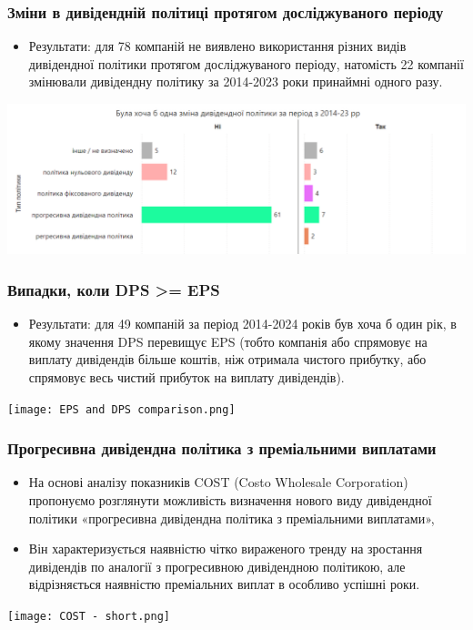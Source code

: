 \documentclass[aspectratio=169]{beamer}
\begin{document}
\begin{frame}
\frametitle{Зміни в дивідендній політиці протягом досліджуваного періоду}
\begin{center}
\begin{itemize}
\item  \alert {Результати:} для 78 компаній не виявлено використання різних видів дивідендної політики протягом досліджуваного періоду, натомість 22 компанії змінювали дивідендну політику за 2014-2023 роки принаймні одного разу.
\end{itemize} 
\bigskip
\includegraphics[scale=0.35]{Dividend policy Changes.png}
\end{center}
\end{frame}

\begin{frame}
\frametitle{Випадки, коли DPS >= EPS }
\begin{center}
\begin{itemize}
\item  \alert {Результати:} для 49 компаній за період 2014-2024 років був хоча б один рік, в якому значення DPS перевищує EPS (тобто компанія або спрямовує на виплату дивідендів більше коштів, ніж отримала чистого прибутку, або спрямовує весь чистий прибуток на виплату дивідендів).
\end{itemize}
\bigskip
\texttt{[image: EPS and DPS comparison.png]}
\end{center}
\end{frame}

\begin{frame}
\frametitle{Прогресивна дивідендна політика з преміальними виплатами}
\begin{multicols}{2}
\begin{itemize}
\item На основі аналізу показників COST (Costo Wholesale Corporation) пропонуємо розглянути можливість визначення нового виду дивідендної політики \alert {«прогресивна дивідендна політика з преміальними виплатами»},
\bigskip
\item Він \alert {характеризується} наявністю чітко вираженого тренду на зростання дивідендів по аналогії з прогресивною дивідендною політикою, але відрізняється наявністю преміальних виплат в особливо успішні роки.
\end{itemize}
\columnbreak
\hspace{5mm}
\texttt{[image: COST - short.png]}
\end{multicols}
\end{frame}
\end{document}
